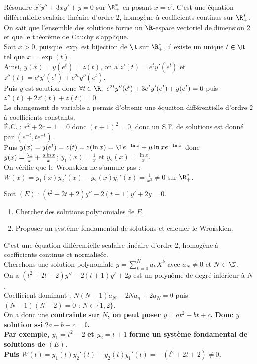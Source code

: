 \documentclass[11pt]{article}
\begin{document}
\begin{exercice}{}{}
    Résoudre $x^2y'' + 3xy' + y = 0$ sur $\R_+^*$ en posant $x=e^t$.
    \tcblower
    C'est une équation différentielle scalaire linéaire d'ordre 2, homogène à coefficients continus sur $\R_+^*$. On sait que l'ensemble des solutions forme un $\R$-espace vectoriel de dimension 2 et que le théorème de Cauchy s'applique.\\
    Soit $x>0$, puisque $\exp$ est bijection de $\R$ sur $\R_+^*$, il existe un unique $t\in\R$ tel que $x=\exp(t)$.\\
    Ainsi, $y(x)=y(e^t)=z(t)$, on a $z'(t)=e^ty'(e^t)$ et $z''(t)=e^ty'(e^t)+e^{2t}y''(e^t)$.\\
    Puis $y$ est solution donc $\forall t \in \R, ~ e^{2t}y''(e^t)+3e^ty'(e^t)+y(e^t)=0$ puis $z''(t)+2z'(t)+z(t)=0$.\\
    Le changement de variable a permis d'obtenir une équaiton différentielle d'ordre 2 à coefficients constants.\\
    É.C. : $r^2+2r+1=0$ donc $(r+1)^2=0$, donc un S.F. de solutions est donné par $(e^{-t}, te^{-t})$.\\
    Puis $y(x)=y(e^t)=z(t)=z(\ln x)=\l e^{-\ln x} + \mu \ln x e^{-\ln x}$ donc $y(x)=\frac{\l}{x} + \frac{\mu \ln x}{x}$; $y_1(x)=\frac{1}{x}$ et $y_2(x)=\frac{\ln x}{x}$.\\
    On vérifie que le Wronskien ne s'annule pas : $W(x)=y_1(x)y_2'(x)-y_2(x)y_1'(x)=\frac{1}{x^3}\neq0$ sur $\R_+^*$.
\end{exercice}

\pagebreak

\begin{exercice}{}{}
    Soit $(E) ~:~ (t^2+2t+2)y'' - 2(t+1)y' + 2y = 0$.
    \begin{enumerate}
        \item Chercher des solutions polynomiales de $E$.
        \item Proposer un système fondamental de solutions et calculer le Wronskien.
    \end{enumerate}
    \tcblower
    C'est une équation différentielle scalaire linéaire d'ordre 2, homogène à coefficients continus et normalisée.\\
    Cherchons une solution polynomiale $y=\sum_{k=0}^Na_kX^k$ avec $a_N\neq0$ et $N\in\N$.\\
    On a $(t^2+2t+2)y'' - 2(t+1)y' + 2y$ est un polynôme de degré inférieur à $N$.\\
    Coefficient dominant : $N(N-1)a_N - 2Na_n + 2a_N = 0$ puis $(N-1)(N-2)=0$ : $N\in\{1,2\}$.\\
    On a donc une \bf{contrainte sur $N$}, on peut poser $y=at^2+bt+c$. Donc $y$ solution ssi $2a-b+c = 0$.\\
    Par exemple, $y_1 = t^2 - 2$ et $y_2=t+1$ forme un système fondamental de solutions de $(E)$.\\
    Puis $W(t)=y_1(t)y_2'(t)-y_2(t)y_1'(t)=-(t^2+2t+2)\neq0$.
\end{exercice}
\end{document}
